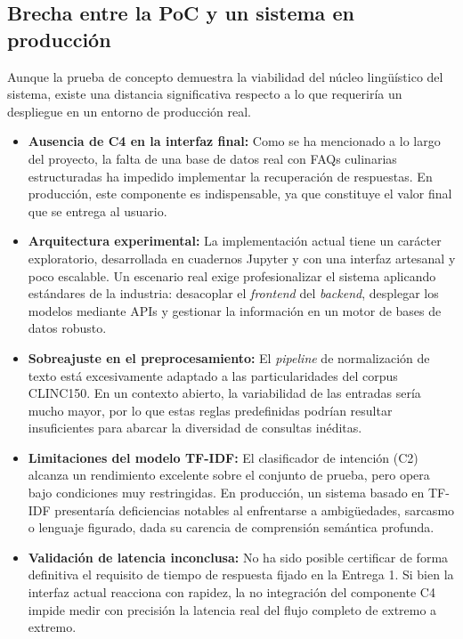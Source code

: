 \documentclass[11pt,a4paper,twoside]{article}
\theoremstyle{definition}
\numberwithin{equation}{section}
\begin{document}
\subsection{Brecha entre la PoC y un sistema en producción}
Aunque la prueba de concepto demuestra la viabilidad del núcleo lingüístico del sistema, existe una distancia significativa respecto a lo que requeriría un despliegue en un entorno de producción real.
\begin{itemize}
	\item \textbf{Ausencia de C4 en la interfaz final:} Como se ha mencionado a lo largo del proyecto, la falta de una base de datos real con FAQs culinarias estructuradas ha impedido implementar la recuperación de respuestas. En producción, este componente es indispensable, ya que constituye el valor final que se entrega al usuario.
	
	\item \textbf{Arquitectura experimental:} La implementación actual tiene un carácter exploratorio, desarrollada en cuadernos Jupyter y con una interfaz artesanal y poco escalable. Un escenario real exige profesionalizar el sistema aplicando estándares de la industria: desacoplar el \textit{frontend} del \textit{backend}, desplegar los modelos mediante APIs y gestionar la información en un motor de bases de datos robusto.
	
	\item \textbf{Sobreajuste en el preprocesamiento:} El \textit{pipeline} de normalización de texto está excesivamente adaptado a las particularidades del corpus CLINC150. En un contexto abierto, la variabilidad de las entradas sería mucho mayor, por lo que estas reglas predefinidas podrían resultar insuficientes para abarcar la diversidad de consultas inéditas.
	
	\item \textbf{Limitaciones del modelo TF-IDF:} El clasificador de intención (C2) alcanza un rendimiento excelente sobre el conjunto de prueba, pero opera bajo condiciones muy restringidas. En producción, un sistema basado en TF-IDF presentaría deficiencias notables al enfrentarse a ambigüedades, sarcasmo o lenguaje figurado, dada su carencia de comprensión semántica profunda.
	
	\item \textbf{Validación de latencia inconclusa:} No ha sido posible certificar de forma definitiva el requisito de tiempo de respuesta fijado en la Entrega 1. Si bien la interfaz actual reacciona con rapidez, la no integración del componente C4 impide medir con precisión la latencia real del flujo completo de extremo a extremo.
\end{itemize}
\end{document}
